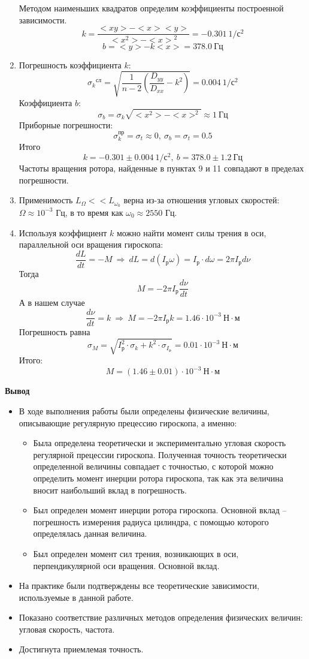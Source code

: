 \documentclass[a4paper,12pt]{article}
\begin{document}
\begin{enumerate}
	Методом наименьших квадратов определим коэффициенты построенной зависимости.
	$$
	k = \frac{<x y> - <x> <y>}{<x^2> - {<x>}^2} = -0.301~1/\text{с}^2
	$$
	$$
	b = <y> - k<x> = 378.0~\text{Гц}
	$$

	\item
	Погрешность коэффициента $k$:
	$$
	{\sigma_k}^{\text{сл}}= \sqrt{\frac{1}{n-2}\left(\frac{D_{yy}}{D_{xx}} - k^2 \right)} = 0.004~1/\text{с}^2
	$$
	Коэффициента $b$:
	$$
	\sigma_b = \sigma_k \sqrt{<x^2> - <x>^2}\approx 1~\text{Гц}
	$$
	Приборные погрешности:
	$$
	\sigma_k^{\text{пр}} = \sigma_t \approx 0,~\sigma_b = \sigma_t = 0.5
	$$
	Итого
	$$
	k = -0.301\pm 0.004~1/\text{с}^2,~b = 378.0\pm 1.2~\text{Гц}
	$$
	Частоты вращения ротора, найденные в пунктах 9 и 11 совпадают в пределах погрешности.

	\item 
	Применимость $L_{\Omega} << L_{\omega_0}$ верна из-за отношения угловых скоростей: $\Omega \approx 10^{-3}$ Гц, в то время как $\omega_0 \approx 2550$ Гц.

	\item Используя коэффициент $k$ можно найти момент силы трения в оси, параллельной оси вращения гироскопа:
	$$
	\frac{dL}{dt} = -M~\Rightarrow~dL = d(I_{\text{р}}\omega) = I_{\text{р}}\cdot d\omega = 2\pi I_{\text{р}} d\nu
	$$
	Тогда
	$$
	M = -2\pi I_{\text{р}} \frac{d\nu}{dt}
	$$
	А в нашем случае 
	$$
	\frac{d\nu}{dt} = k~\Rightarrow~M = -2\pi I_{\text{р}}k = 1.46 \cdot 10^{-3}~\text{Н}\cdot\text{м}
	$$
	Погрешность равна
	$$
	\sigma_M = \sqrt{I_{\text{р}}^2\cdot\sigma_k + k^2\cdot\sigma_{I_{\text{р}}}} = 0.01 \cdot 10^{-3}~\text{Н}\cdot\text{м}
	$$
	Итого:
	$$
	M = (1.46 \pm 0.01) \cdot 10^{-3}~\text{Н}\cdot\text{м}
	$$
\end{enumerate}

\textbf{Вывод}
\begin{itemize}
	\item В ходе выполнения работы были определены физические величины, описывающие регулярную прецессию гироскопа, а именно:
		\begin{itemize}
			\item Была определена теоретически и экспериментально угловая скорость регулярной прецессии гироскопа. Полученная точность теоретически определенной величины совпадает с точностью, с которой можно определить момент инерции ротора гироскопа, так как эта величина вносит наибольший вклад в погрешность.
			\item Был определен момент инерции ротора гироскопа. Основной вклад -- погрешность измерения радиуса цилиндра, с помощью которого определялась данная величина.
			\item Был определен момент сил трения, возникающих в оси, перпендикулярной оси вращения. Основной вклад.
		\end{itemize}
	\item На практике были подтверждены все теоретические зависимости, используемые в данной работе.
	\item Показано соответствие различных методов определения физических величин: угловая скорость, частота.
	\item Достигнута приемлемая точность.
\end{itemize}
\end{document}
